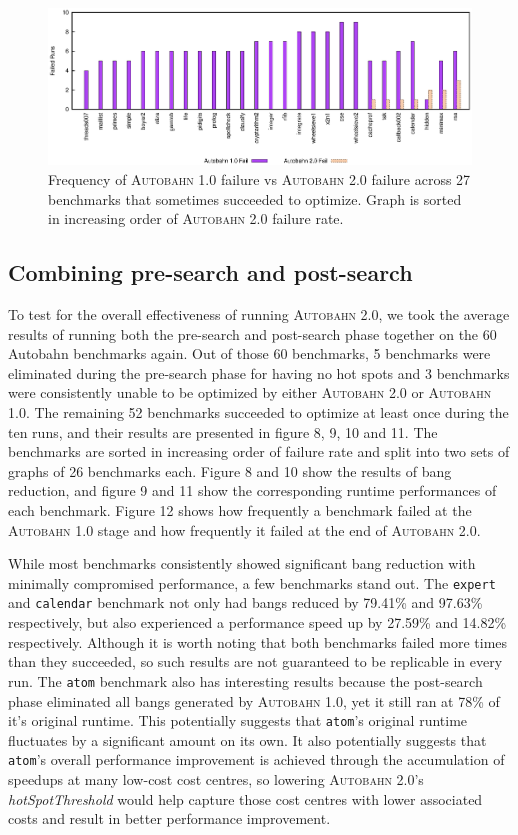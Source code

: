 \documentclass[format=sigplan, review=true]{acmart}
\newcommand{\hotspots}[0]{hot spots}
\newcommand{\hotspotcost}[0]{\textit{hotSpotThreshold}}
\newcommand{\Ao}[0]{\textsc{Autobahn 1.0}}
\newcommand{\At}[0]{\textsc{Autobahn 2.0}}
\newcommand{\preopt}[0]{pre-search}
\newcommand{\postopt}[0]{post-search}
\begin{document}
\begin{figure}
\includegraphics[width=\textwidth]{aut-post-fail}
\caption{Frequency of \Ao{} failure vs \At{} failure across 27 benchmarks that sometimes succeeded to optimize. Graph is sorted in increasing order of \At{} failure rate. }
\end{figure}

\subsection{Combining \preopt{} and \postopt{}}

To test for the overall effectiveness of running \At{}, we took the average results of running both the \preopt{} and \postopt{} phase together on the 60 Autobahn benchmarks again. Out of those 60 benchmarks, 5 benchmarks were eliminated during the \preopt{} phase for having no \hotspots{} and 3 benchmarks were consistently unable to be optimized by either \At{} or \Ao{}. The remaining 52 benchmarks succeeded to optimize at least once during the ten runs, and their results are presented in figure 8, 9, 10 and 11. The benchmarks are sorted in increasing order of failure rate and split into two sets of graphs of 26 benchmarks each. Figure 8 and 10 show the results of bang reduction, and figure 9 and 11 show the corresponding runtime performances of each benchmark. Figure 12 shows how frequently a benchmark failed at the \Ao{} stage and how frequently it failed at the end of \At{}.

While most benchmarks consistently showed significant bang reduction with minimally compromised performance, a few benchmarks stand out. The \texttt{expert} and \texttt{calendar} benchmark not only had bangs reduced by 79.41\% and 97.63\% respectively, but also experienced a performance speed up by 27.59\% and 14.82\% respectively. Although it is worth noting that both benchmarks failed more times than they succeeded, so such results are not guaranteed to be replicable in every run. The \texttt{atom} benchmark also has interesting results because the \postopt{} phase eliminated all bangs generated by \Ao{}, yet it still ran at 78\% of it's original runtime. This potentially suggests that \texttt{atom}'s original runtime fluctuates by a significant amount on its own. It also potentially suggests that \texttt{atom}'s overall performance improvement is achieved through the accumulation of speedups at many low-cost cost centres, so lowering \At{}'s \hotspotcost{} would help capture those cost centres with lower associated costs and result in better performance improvement.
\end{document}

